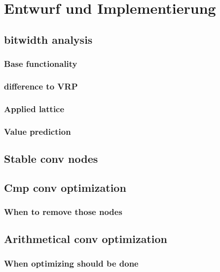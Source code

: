 \chapter{Entwurf und Implementierung}\label{sec:impl}

\section{bitwidth analysis}
\subsection{Base functionality}
\subsection{difference to VRP}
\subsection{Applied lattice}
\subsection{Value prediction}


\section{Stable conv nodes}

\section{Cmp conv optimization}
\subsection{When to remove those nodes}

\section{Arithmetical conv optimization}
\subsection{When optimizing should be done}